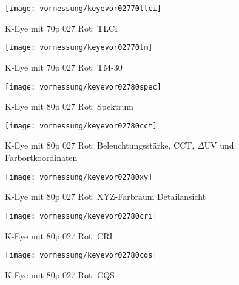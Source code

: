 \documentclass[pagesize,paper=A4,fontsize=12pt,utf8,numbers=noenddot,bibliography=totoc,listof=totoc,DIV=11,BCOR=1mm]{scrreprt}
\begin{document}
\begin{figure}[htp]     %
\centering
\texttt{[image: vormessung/keyevor02770tlci]} 
\caption {K-Eye mit 70p 027 Rot: TLCI} 
\end{figure}

\begin{figure}[htp]     %
\centering
\texttt{[image: vormessung/keyevor02770tm]} 
\caption {K-Eye mit 70p 027 Rot: TM-30} 
\end{figure}




\begin{figure}[htp]     %
\centering
\texttt{[image: vormessung/keyevor02780spec]} 
\caption {K-Eye mit 80p 027 Rot: Spektrum} 
\end{figure}

\begin{figure}[htp]     %
\centering
\texttt{[image: vormessung/keyevor02780cct]} 
\caption {K-Eye mit 80p 027 Rot: Beleuchtungsstärke, CCT, $\Delta$UV und Farbortkoordinaten} 
\end{figure}

\begin{figure}[htp]     %
\centering
\texttt{[image: vormessung/keyevor02780xy]} 
\caption {K-Eye mit 80p 027 Rot: XYZ-Farbraum Detailansicht} 
\end{figure}

\begin{figure}[htp]     %
\centering
\texttt{[image: vormessung/keyevor02780cri]} 
\caption {K-Eye mit 80p 027 Rot: CRI} 
\end{figure}

\begin{figure}[htp]     %
\centering
\texttt{[image: vormessung/keyevor02780cqs]} 
\caption {K-Eye mit 80p 027 Rot: CQS} 
\end{figure}
\end{document}
